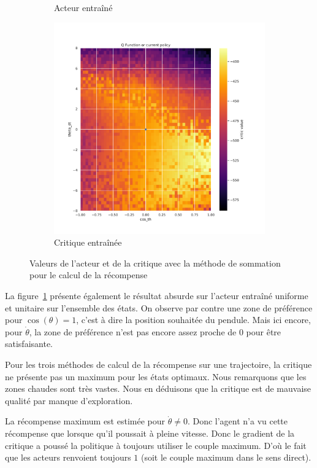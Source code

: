 \begin{figure}[H]
\begin{subfigure}{0.3\textwidth}
        \caption{Acteur entraîné}
    \end{subfigure}
    \begin{subfigure}{0.3\textwidth}
        \includegraphics[width=\textwidth]{figures/prelimaire/0_critic_sum_post_Pendulum-v0.pdf}
        \caption{Critique entraînée}
    \end{subfigure}
    \caption{Valeurs de l'acteur et de la critique avec la méthode de sommation pour le calcul de la récompense}
    \label{fig:preli_sum}
\end{figure}

La figure~\ref{fig:preli_sum} présente également le résultat absurde sur l'acteur entraîné uniforme et unitaire sur l'ensemble des états. On observe par contre une zone de préférence pour $\cos(\theta) = 1$, c'est à dire la position souhaitée du pendule. Mais ici encore, pour $\dot{\theta}$, la zone de préférence n'est pas encore assez proche de 0 pour être satisfaisante.

Pour les trois méthodes de calcul de la récompense sur une trajectoire, la critique ne présente pas un maximum pour les états optimaux. Nous remarquons que les zones chaudes sont très vastes. Nous en déduisons que la critique est de mauvaise qualité par manque d'exploration.

La récompense maximum est estimée pour $\dot{\theta} \not= 0$. Donc l'agent n'a vu cette récompense que lorsque qu'il poussait à pleine vitesse. Donc le gradient de la critique a poussé la politique à toujours utiliser le couple maximum. D'où le fait que les acteurs renvoient toujours $1$ (soit le couple maximum dans le sens direct).